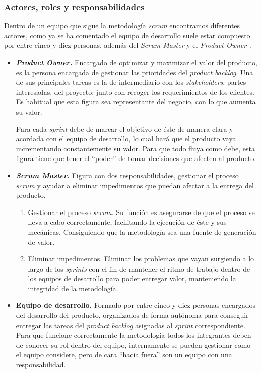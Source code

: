 \subsubsection{Actores, roles y responsabilidades}
Dentro de un equipo que sigue la metodología \textit{scrum} encontramos diferentes actores, como ya se ha comentado el equipo de desarrollo suele estar compuesto por entre cinco y diez personas, además del \textit{Scrum Master} y el \textit{Product Owner}~\cite{julioroche_2020}.
\begin{itemize}
\item \textbf{\textit{Product Owner.}} Encargado de optimizar y maximizar el valor del producto, es la persona encargada de gestionar las prioridades del \textit{product backlog}. Una de sus principales tareas es la de intermediario con los \textit{stakeholders}, partes interesadas, del proyecto; junto con recoger los requerimientos de los clientes. Es habitual que esta figura sea representante del negocio, con lo que aumenta su valor.

Para cada \textit{sprint} debe de marcar el objetivo de éste de manera clara y acordada con el equipo de desarrollo, lo cual hará que el producto vaya incrementando constantemente su valor. Para que todo fluya como debe, esta figura tiene que tener el ``poder'' de tomar decisiones que afecten al producto.

\item \textbf{\textit{Scrum Master.}} Figura con dos responsabilidades, gestionar el proceso \textit{scrum} y ayudar a eliminar impedimentos que puedan afectar a la entrega del producto.
\begin{enumerate}
\item Gestionar el proceso \textit{scrum}. Su función es asegurarse de que el proceso se lleva a cabo correctamente, facilitando la ejecución de éste y sus mecánicas. Consiguiendo que la metodología sea una fuente de generación de valor.
\item Eliminar impedimentos. Eliminar los problemas que vayan surgiendo a lo largo de los \textit{sprints} con el fin de mantener el ritmo de trabajo dentro de los equipos de desarrollo para poder entregar valor, manteniendo la integridad de la metodología.
\end{enumerate}
\item \textbf{Equipo de desarrollo.} Formado por entre cinco y diez personas encargados del desarrollo del producto, organizados de forma autónoma para conseguir entregar las tareas del \textit{product backlog} asignadas al \textit{sprint} correspondiente. Para que funcione correctamente la metodología todos los integrantes deben de conocer su rol dentro del equipo, internamente se pueden gestionar como el equipo considere, pero de cara ``hacia fuera'' son un equipo con una responsabilidad.
\end{itemize}
\newpage
